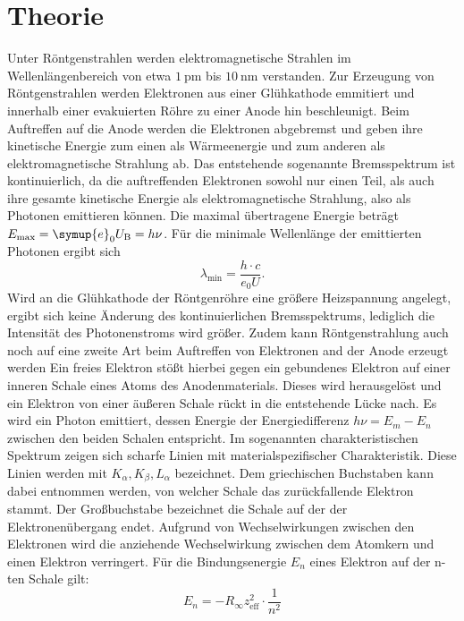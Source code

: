 \section{Theorie}
\label{sec:Theorie}
Unter Röntgenstrahlen werden elektromagnetische Strahlen im Wellenlängenbereich von etwa $\SI{1}{\pico\meter}$ bis $\SI{10}{\nano\meter}$ verstanden.
Zur Erzeugung von Röntgenstrahlen werden Elektronen aus einer Glühkathode emmitiert und innerhalb einer evakuierten Röhre zu einer Anode hin beschleunigt.
Beim Auftreffen auf die Anode werden die Elektronen abgebremst und geben ihre kinetische Energie zum einen als Wärmeenergie und zum anderen als elektromagnetische Strahlung ab.
Das entstehende sogenannte Bremsspektrum ist kontinuierlich, da die auftreffenden Elektronen sowohl nur einen Teil, als auch ihre gesamte kinetische Energie als elektromagnetische Strahlung, also als Photonen emittieren können.
Die maximal übertragene Energie beträgt $E_\mathrm{max}=\symup{e}_0U_\mathrm{B}=h\nu$.
Für die minimale Wellenlänge der emittierten Photonen ergibt sich
\begin{equation}
  \lambda_\mathrm{min}=\frac{h\cdot c}{e_0U} \text{.}
\end{equation}
Wird an die Glühkathode der Röntgenröhre eine größere Heizspannung angelegt, ergibt sich keine Änderung des kontinuierlichen Bremsspektrums, lediglich die Intensität des Photonenstroms wird größer.
Zudem kann Röntgenstrahlung auch noch auf eine zweite Art beim Auftreffen von Elektronen and der Anode erzeugt werden
Ein freies Elektron stößt hierbei gegen ein gebundenes Elektron auf einer inneren Schale eines Atoms des Anodenmaterials.
Dieses wird herausgelöst und ein Elektron von einer äußeren Schale rückt in die entstehende Lücke nach. Es wird ein Photon emittiert, dessen Energie der Energiedifferenz $h\nu=E_m-E_n$ zwischen den beiden Schalen entspricht.
Im sogenannten charakteristischen Spektrum zeigen sich scharfe Linien mit materialspezifischer Charakteristik.
Diese Linien werden mit $K_\alpha,K_\beta,L_\alpha$ bezeichnet. Dem griechischen Buchstaben kann dabei entnommen werden, von welcher Schale das zurückfallende Elektron
stammt. Der Großbuchstabe bezeichnet die Schale auf der der Elektronenübergang endet.
Aufgrund von Wechselwirkungen zwischen den Elektronen wird die anziehende Wechselwirkung zwischen dem Atomkern und einen Elektron verringert.
Für  die Bindungsenergie $E_n$ eines Elektron auf der n-ten Schale gilt:
\begin{equation}
  E_n=-R_\infty z_\mathrm{eff}^2 \cdot \frac{1}{n^2}
\end{equation}
